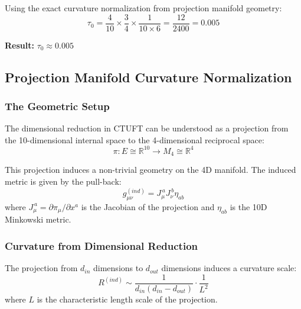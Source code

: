 Using the exact curvature normalization from projection manifold geometry:
\begin{equation}
    \tau_0 = \frac{4}{10} \times \frac{3}{4} \times \frac{1}{10 \times 6} = \frac{12}{2400} = 0.005
\end{equation}

\textbf{Result:} $\tau_0 \approx 0.005$

\subsection{Projection Manifold Curvature Normalization}

\subsubsection{The Geometric Setup}

The dimensional reduction in CTUFT can be understood as a projection from the 10-dimensional internal space to the 4-dimensional reciprocal space:
\begin{equation}
    \pi: E \cong \mathbb{R}^{10} \longrightarrow M_4 \cong \mathbb{R}^4
\end{equation}

This projection induces a non-trivial geometry on the 4D manifold. The induced metric is given by the pull-back:
\begin{equation}
    g_{\mu\nu}^{(ind)} = J_\mu^{\,a} J_\nu^{\,b} \eta_{ab}
\end{equation}
where $J_\mu^{\,a} = \partial \pi_\mu / \partial x^a$ is the Jacobian of the projection and $\eta_{ab}$ is the 10D Minkowski metric.

\subsubsection{Curvature from Dimensional Reduction}

\begin{theorem}
The projection from $d_{in}$ dimensions to $d_{out}$ dimensions induces a curvature scale:
\begin{equation}
    R^{(ind)} \sim \frac{1}{d_{in}(d_{in} - d_{out})} \cdot \frac{1}{L^2}
\end{equation}
where $L$ is the characteristic length scale of the projection.
\end{theorem}

